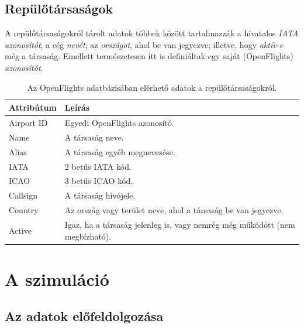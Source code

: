     \subsection{Repülőtársaságok}

    A repülőtársaságokról tárolt adatok többek között tartalmazzák a hivatalos \emph{IATA azonosítót}; a cég \emph{nevét}; az \emph{országot}, ahol be van jegyezve; illetve, hogy \emph{aktív-e} még a társaság. Emellett természetesen itt is definiáltak egy saját (OpenFlights) \emph{azonosítót}.

    \begin{table}[ht]
      \footnotesize
      \centering
      \caption{Az OpenFlights adatbázisában elérhető adatok a repülőtársaságokról.}
      \begin{tabular}{ | l | l |}
      \hline
      Attribútum & Leírás \\ \hline
      Airport ID & Egyedi OpenFlights azonosító.\\
      Name & A társaság neve.\\
      Alias & A társaság egyéb megnevezése.\\
      IATA & 2 betűs IATA kód.\\
      ICAO & 3 betűs ICAO kód.\\
      Callsign & A társaság hívójele.\\
      Country & Az ország vagy terület neve, ahol a társaság be van jegyezve.\\
      Active & Igaz, ha a társaság jelenleg is, vagy nemrég még működött (nem megbízható).\\
      \hline
      \end{tabular}
      \label{tab:table_repulesitarsasagok}
    \end{table}

  \section{A szimuláció}
    \subsection{Az adatok előfeldolgozása}

